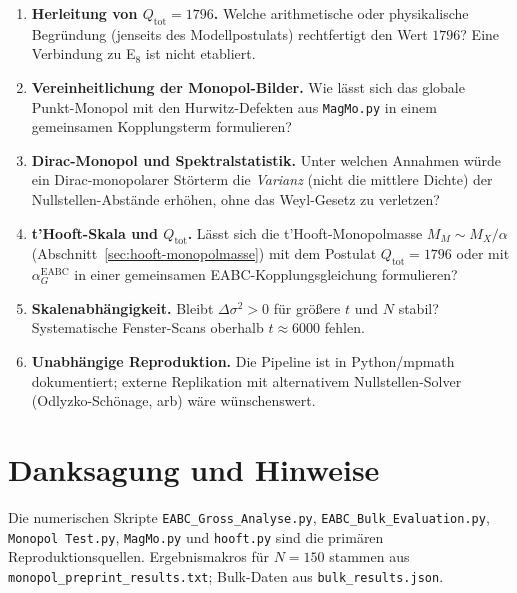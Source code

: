 \documentclass[11pt,a4paper]{article}
\begin{document}
\begin{enumerate}
  \item \textbf{Herleitung von $Q_{\mathrm{tot}}=1796$.}
        Welche arithmetische oder physikalische Begründung (jenseits des Modellpostulats)
        rechtfertigt den Wert $1796$? Eine Verbindung zu E$_8$ ist nicht etabliert.

  \item \textbf{Vereinheitlichung der Monopol-Bilder.}
        Wie lässt sich das globale Punkt-Monopol mit den Hurwitz-Defekten aus
        \texttt{MagMo.py} in einem gemeinsamen Kopplungsterm formulieren?

  \item \textbf{Dirac-Monopol und Spektralstatistik.}
        Unter welchen Annahmen würde ein Dirac-monopolarer Störterm die
        \emph{Varianz} (nicht die mittlere Dichte) der Nullstellen-Abstände
        erhöhen, ohne das Weyl-Gesetz zu verletzen?

  \item \textbf{t'Hooft-Skala und $Q_{\mathrm{tot}}$.}
        Lässt sich die t'Hooft-Monopolmasse $M_M\sim M_X/\alpha$
        (Abschnitt~\ref{sec:hooft-monopolmasse}) mit dem Postulat
        $Q_{\mathrm{tot}}=1796$ oder mit $\alpha_G^{\mathrm{EABC}}$ in einer
        gemeinsamen EABC-Kopplungsgleichung formulieren?

  \item \textbf{Skalenabhängigkeit.}
        Bleibt $\Delta\sigma^2 > 0$ für größere $t$ und $N$ stabil?
        Systematische Fenster-Scans oberhalb $t\approx 6000$ fehlen.

  \item \textbf{Unabhängige Reproduktion.}
        Die Pipeline ist in Python/mpmath dokumentiert; externe Replikation
        mit alternativem Nullstellen-Solver (Odlyzko-Schönage, arb) wäre wünschenswert.
\end{enumerate}

\section*{Danksagung und Hinweise}

Die numerischen Skripte \texttt{EABC\_Gross\_Analyse.py},
\texttt{EABC\_Bulk\_Evaluation.py}, \texttt{Monopol Test.py}, \texttt{MagMo.py}
und \texttt{hooft.py} sind die primären Reproduktionsquellen. Ergebnismakros für $N=150$ stammen aus
\texttt{monopol\_preprint\_results.txt}; Bulk-Daten aus \texttt{bulk\_results.json}.
\end{document}
